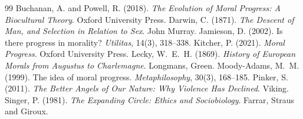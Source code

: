 \documentclass{situationist-preprint}
\begin{document}
\begin{thebibliography}{99}\small
{} Buchanan, A. and Powell, R. (2018). \emph{The Evolution of Moral Progress: A Biocultural Theory}. Oxford University Press.
 Darwin, C. (1871). \emph{The Descent of Man, and Selection in Relation to Sex}. John Murray.
 Jamieson, D. (2002). Is there progress in morality? \emph{Utilitas}, 14(3), 318--338.
 Kitcher, P. (2021). \emph{Moral Progress}. Oxford University Press.
 Lecky, W.~E.~H. (1869). \emph{History of European Morals from Augustus to Charlemagne}. Longmans, Green.
 Moody-Adams, M.~M. (1999). The idea of moral progress. \emph{Metaphilosophy}, 30(3), 168--185.
 Pinker, S. (2011). \emph{The Better Angels of Our Nature: Why Violence Has Declined}. Viking.
 Singer, P. (1981). \emph{The Expanding Circle: Ethics and Sociobiology}. Farrar, Straus and Giroux.
\end{thebibliography}
\end{document}
